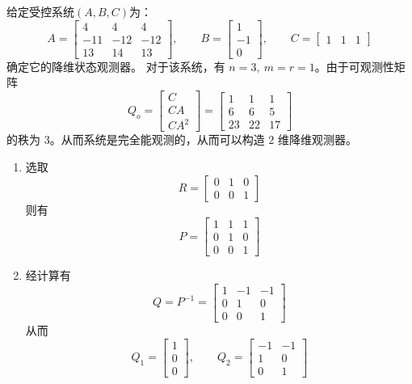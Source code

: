 \begin{example}
    给定受控系统$(A,B,C)$为：
    \[
    A=
    \begin{bmatrix}
    4 & 4 & 4\\
    -11 & -12 & -12\\
    13 & 14 & 13
    \end{bmatrix},
    \qquad
    B=
    \begin{bmatrix}
    1\\
    -1\\
    0
    \end{bmatrix},
    \qquad
    C=
    \begin{bmatrix}
    1 & 1 & 1
    \end{bmatrix}
    \]
    确定它的降维状态观测器。
    \tcblower
    对于该系统，有 $n=3,\ m=r=1$。由于可观测性矩阵
    \[
    Q_o=
    \begin{bmatrix}
    C\\
    CA\\
    CA^2
    \end{bmatrix}
    =
    \begin{bmatrix}
    1 & 1 & 1\\
    6 & 6 & 5\\
    23 & 22 & 17
    \end{bmatrix}
    \]
    的秩为 $3$。从而系统是完全能观测的，从而可以构造 $2$ 维降维观测器。
    \begin{enumerate}[label=\textbf{第 \arabic* 步.}, leftmargin=*]
        \item 选取
        \[
        R=
        \begin{bmatrix}
        0 & 1 & 0\\
        0 & 0 & 1
        \end{bmatrix}
        \]
        则有
        \[
        P=
        \begin{bmatrix}
        1 & 1 & 1\\
        0 & 1 & 0\\
        0 & 0 & 1
        \end{bmatrix}
        \]

        \item 经计算有
        \[
        Q=P^{-1}=
        \begin{bmatrix}
        1 & -1 & -1\\
        0 & 1 & 0\\
        0 & 0 & 1
        \end{bmatrix}
        \]
        从而
        \[
        Q_1=
        \begin{bmatrix}
        1\\0\\0
        \end{bmatrix},
        \qquad
        Q_2=
        \begin{bmatrix}
        -1 & -1\\
        1 & 0\\
        0 & 1
        \end{bmatrix}
        \]


\end{enumerate}
\end{example}

